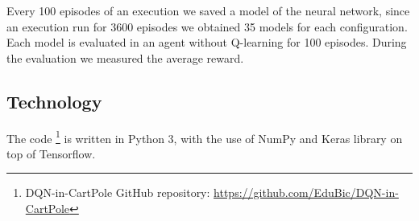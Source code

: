 Every 100 episodes of an execution we saved a model of the neural network, since an execution run for 3600 episodes we obtained 35 models for each configuration. Each model is evaluated in an agent without Q-learning for 100 episodes. During the evaluation we measured the average reward.

\subsection{Technology}
The code \footnote{DQN-in-CartPole GitHub repository: \url{https://github.com/EduBic/DQN-in-CartPole}} is written in Python 3, with the use of NumPy and Keras library on top of Tensorflow.





